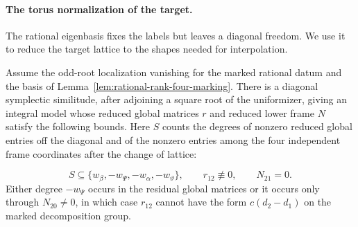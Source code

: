 \paragraph{The torus normalization of the target.}
\label{par:count-two-normalization}
The rational eigenbasis fixes the labels but leaves a diagonal freedom. We use it to
reduce the target lattice to the shapes needed for interpolation.

\begin{proposition}
\label{prop:rational-rank-four-torus}
Assume the odd-root localization vanishing for the marked rational
datum and the basis of Lemma~\ref{lem:rational-rank-four-marking}.
There is a diagonal symplectic similitude, after adjoining
a square root of the uniformizer, giving an integral model
whose reduced global matrices \(r\) and reduced lower frame \(N\)
satisfy the following bounds. Here \(S\) counts the degrees of
nonzero reduced global entries off the diagonal and of the nonzero entries among the four
independent frame coordinates after the change of lattice:

\[
 S\subseteq\{w_\beta,-w_\Psi,-w_\alpha,-w_\vartheta\},
       \qquad r_{12}\not\equiv0,\qquad N_{21}=0.
\] Either degree \(-w_\Psi\) occurs in the residual
global matrices or it occurs only through \(N_{20}\ne0\),
in which case \(r_{12}\) cannot have the form
\(c(d_2-d_1)\) on the marked decomposition group.
\end{proposition}

